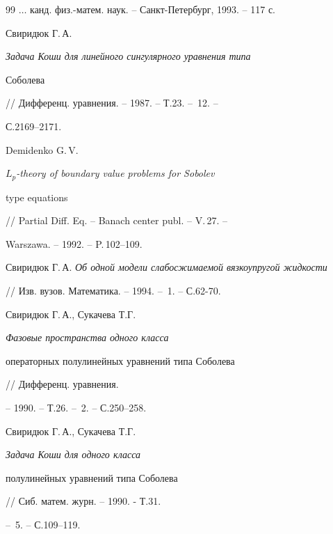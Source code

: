 \begin{thebibliography}{99}
$\dots$ канд. физ.-матем. наук. -- Санкт-Петербург, 1993. -- 117 с. 


 




Свиридюк Г.\,А. {\em Задача Коши для линейного сингулярного уравнения типа 


Соболева} // Дифференц. уравнения. -- 1987. -- Т.23. -- \No\,12. -- 


С.2169--2171. 


 




Demidenko G.\,V. {\em $L_p$-theory of boundary value problems for Sobolev 


type equations} // Partial Diff. Eq. -- Banach center publ. -- V.\,27. -- 


Warszawa. -- 1992. -- P.\,102--109. 


 




Свиридюк Г.\,А. {\em Об одной модели слабосжимаемой вязкоупругой жидкости} 


// Изв. вузов. Математика. -- 1994. -- \No\,1. -- С.62-70. 


 




Свиридюк Г.\,А., Сукачева Т.Г. {\em Фазовые пространства одного класса 


операторных полулинейных уравнений типа Соболева} // Дифференц. уравнения. 


-- 1990. -- Т.26. -- \No\,2. -- С.250--258. 


 




Свиридюк Г.\,А., Сукачева Т.Г. {\em Задача Коши для одного класса 


полулинейных уравнений типа Соболева} // Сиб. матем. журн. -- 1990. - Т.31. 


-- \No\,5. -- С.109--119. 


 


\end{thebibliography} 


 


\vskip 2cm 


 






 


 


